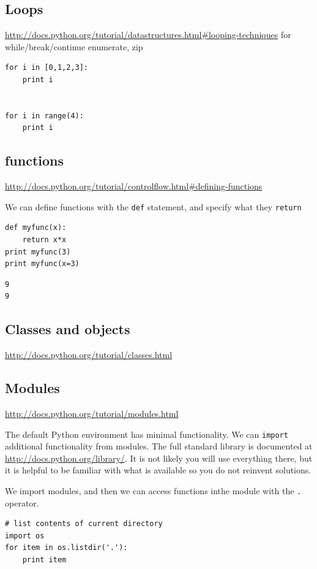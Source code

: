 \documentclass[11pt]{article}
\begin{document}
\subsection{Loops}
\label{sec-3-5}
\url{http://docs.python.org/tutorial/datastructures.html#looping-techniques}
for
while/break/continue
enumerate, zip

\begin{verbatim}
for i in [0,1,2,3]:
    print i


for i in range(4):
    print i
\end{verbatim}


\subsection{functions}
\label{sec-3-6}
\url{http://docs.python.org/tutorial/controlflow.html#defining-functions}

We can define functions with the \texttt{def} statement, and specify what they \texttt{return}
\begin{verbatim}
def myfunc(x):
    return x*x
print myfunc(3)
print myfunc(x=3)
\end{verbatim}

\begin{verbatim}
9
9
\end{verbatim}


\subsection{Classes and objects}
\label{sec-3-7}
\url{http://docs.python.org/tutorial/classes.html}


\subsection{Modules}
\label{sec-3-8}
\url{http://docs.python.org/tutorial/modules.html}

The default Python environment has minimal functionality. We can \texttt{import} additional functionality from modules. The full standard library is documented at \url{http://docs.python.org/library/}. It is not likely you will use everything there, but it is helpful to be familiar with what is available so you do not reinvent solutions.

We import modules, and then we can access functions inthe module with the \texttt{.} operator.

\begin{verbatim}
# list contents of current directory
import os
for item in os.listdir('.'):
    print item
\end{verbatim}
\end{document}
